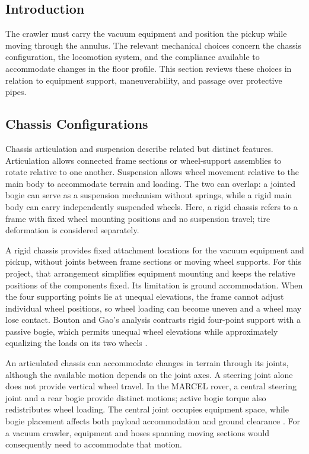 \setcounter{subsection}{-1}
\subsection{Introduction}
\label{sec:mechanical-configurations-introduction}
The crawler must carry the vacuum equipment and position the pickup while moving through the annulus. The relevant mechanical choices concern the chassis configuration, the locomotion system, and the compliance available to accommodate changes in the floor profile. This section reviews these choices in relation to equipment support, maneuverability, and passage over protective pipes.

\subsection{Chassis Configurations}
\label{sec:chassis-configurations}
Chassis articulation and suspension describe related but distinct features. Articulation allows connected frame sections or wheel-support assemblies to rotate relative to one another. Suspension allows wheel movement relative to the main body to accommodate terrain and loading. The two can overlap: a jointed bogie can serve as a suspension mechanism without springs, while a rigid main body can carry independently suspended wheels. Here, a rigid chassis refers to a frame with fixed wheel mounting positions and no suspension travel; tire deformation is considered separately.

A rigid chassis provides fixed attachment locations for the vacuum equipment and pickup, without joints between frame sections or moving wheel supports. For this project, that arrangement simplifies equipment mounting and keeps the relative positions of the components fixed. Its limitation is ground accommodation. When the four supporting points lie at unequal elevations, the frame cannot adjust individual wheel positions, so wheel loading can become uneven and a wheel may lose contact. Bouton and Gao's analysis contrasts rigid four-point support with a passive bogie, which permits unequal wheel elevations while approximately equalizing the loads on its two wheels \citep{bouton2023Marcel}.

An articulated chassis can accommodate changes in terrain through its joints, although the available motion depends on the joint axes. A steering joint alone does not provide vertical wheel travel. In the MARCEL rover, a central steering joint and a rear bogie provide distinct motions; active bogie torque also redistributes wheel loading. The central joint occupies equipment space, while bogie placement affects both payload accommodation and ground clearance \citep{bouton2023Marcel}. For a vacuum crawler, equipment and hoses spanning moving sections would consequently need to accommodate that motion.


